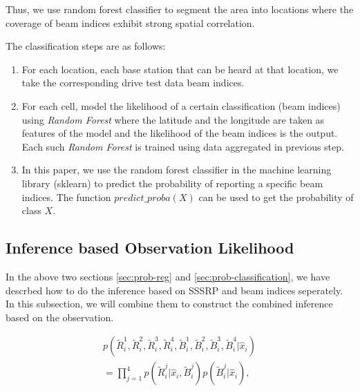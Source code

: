 \documentclass[conference, 10pt]{IEEEtran}
\begin{document}
Thus, we use random forest classifier to segment the area into locations where the coverage of beam indices
exhibit strong spatial correlation. 

The classification steps are as follows:

\begin{enumerate}

\item For each location, each base station that can be heard at that location, we
take the corresponding drive test data beam indices. 

\item For each cell, model the likelihood of a certain classification (beam indices) using {\em Random Forest} where the latitude and the longitude are 
taken as features of the model and the likelihood of the beam indices is the output. Each such {\em
Random Forest} is trained using data aggregated in previous step.

\item In this paper, we use the random forest classifier in the machine learning library (sklearn) to predict the probability of 
reporting a specific beam indices. The function $predict\_proba(X)$ can be used to get the probability of class $X$. 

\end{enumerate}
\subsection{Inference based Observation Likelihood}
\label{sec:prob-combined}
In the above two sections \ref{sec:prob-reg} and \ref{sec:prob-classification}, we have descrbed how to do the inference based on SSSRP and 
beam indices seperately. In this subsection, we will combine them to construct the combined inference based on the observation.

\begin{equation} 
\begin{split}
	p(\tilde{R}^1_i, \tilde{R}^2_i, \tilde{R}^3_i,\tilde{R}^4_i, \tilde{B}^1_i, \tilde{B}^2_i, \tilde{B}^3_i, \tilde{B}^4_i|\hat{x}_{i})
	\\
	=\prod_{j=1}^4 p(\tilde{R}^j_i|\hat{x}_{i}, \tilde{B}^j_i)p(\tilde{B}^j_i|\hat{x}_{i}),
\end{split}
\label{eqn:combined}
\end{equation}

\end{document}
